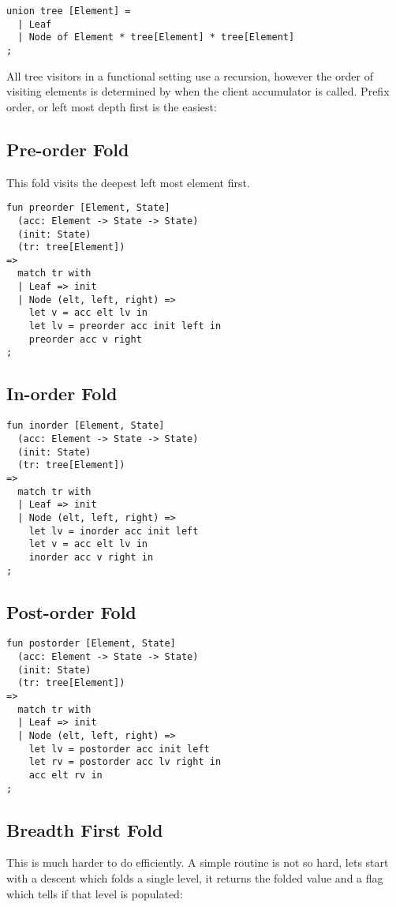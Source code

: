 \documentclass[oneside]{book}
\begin{document}
\begin{verbatim}
union tree [Element] =
  | Leaf
  | Node of Element * tree[Element] * tree[Element]
;
\end{verbatim}

All tree visitors in a functional setting use a recursion, 
however the order of visiting elements is determined by when the 
client accumulator is called. Prefix order, or left most depth first is the easiest:

\subsection{Pre-order Fold}
This fold visits the deepest left most element first.

\begin{verbatim}
fun preorder [Element, State]
  (acc: Element -> State -> State)
  (init: State)
  (tr: tree[Element])
=>
  match tr with
  | Leaf => init
  | Node (elt, left, right) =>
    let v = acc elt lv in
    let lv = preorder acc init left in
    preorder acc v right
;
\end{verbatim}

\subsection{In-order Fold}

\begin{verbatim}
fun inorder [Element, State]
  (acc: Element -> State -> State)
  (init: State)
  (tr: tree[Element])
=>
  match tr with
  | Leaf => init
  | Node (elt, left, right) =>
    let lv = inorder acc init left
    let v = acc elt lv in
    inorder acc v right in
;
\end{verbatim}


\subsection{Post-order Fold}

\begin{verbatim}
fun postorder [Element, State]
  (acc: Element -> State -> State)
  (init: State)
  (tr: tree[Element])
=>
  match tr with
  | Leaf => init
  | Node (elt, left, right) =>
    let lv = postorder acc init left
    let rv = postorder acc lv right in
    acc elt rv in
;
\end{verbatim}

\subsection{Breadth First Fold}
This is much harder to do efficiently. 
A simple routine is not so hard, lets start
with a descent which folds a single level,
it returns the folded value and a flag which
tells if that level is populated:
\end{document}

